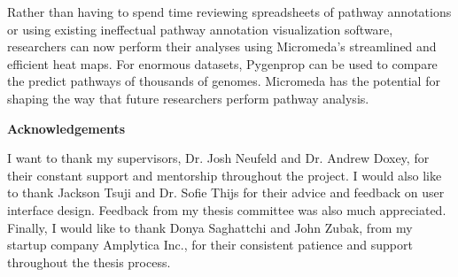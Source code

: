 Rather than having to spend time reviewing spreadsheets of pathway annotations or using existing ineffectual pathway annotation visualization software, researchers can now perform their analyses using Micromeda's streamlined and efficient heat maps. For enormous datasets, Pygenprop can be used to compare the predict pathways of thousands of genomes. Micromeda has the potential for shaping the way that future researchers perform pathway analysis.

\cleardoublepage


\begin{center}\textbf{Acknowledgements}\end{center}

I want to thank my supervisors, Dr. Josh Neufeld and Dr. Andrew Doxey, for their constant support and mentorship throughout the project. I would also like to thank Jackson Tsuji and Dr. Sofie Thijs for their advice and feedback on user interface design. Feedback from my thesis committee was also much appreciated. Finally, I would like to thank Donya Saghattchi and John Zubak, from my startup company Amplytica Inc., for their consistent patience and support throughout the thesis process.
\cleardoublepage

\renewcommand\contentsname{Table of Contents}
\tableofcontents
\cleardoublepage
{}    %

\listoftables
\cleardoublepage
{}		%

\listoffigures
\cleardoublepage
{}		%

\printglossaries
\cleardoublepage
{}		%



